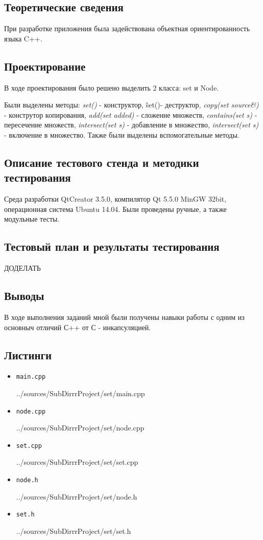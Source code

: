 \documentclass[12pt,a4paper]{report}
\begin{document}
\subsection{Теоретические сведения}
\hspace{\parindent}
При разработке приложения была задействована объектная ориентированность языка C++. 

\subsection{Проектирование}
\hspace{\parindent}
В ходе проектирования было решено выделить 2 класса: set и Node.

\hspace{\parindent}
Были выделены методы: \textit{set()} - конструктор, \~set()- деструктор, \textit{copy(set source\&)} - конструтор копирования, \textit{add(set added)} - сложение множеств, \textit{contains(set s)} - пересечение множеств, \textit{intersect(set s)} - добавление в множество, \textit{intersect(set s)} - включение в множество.
Также были выделены вспомогательные методы.


\subsection{Описание тестового стенда и методики тестирования}
Среда разработки QtCreator 3.5.0, компилятор Qt 5.5.0 MinGW 32bit, операционная система Ubuntu 14.04. Были проведены ручные, а также модульные тесты.

\subsection{Тестовый план и результаты тестирования}
ДОДЕЛАТЬ
\subsection{Выводы}
\hspace{\parindent}
В ходе выполнения заданий мной были получены навыки работы с одним из основныч отличий С++ от С - инкапсуляцией.
\subsection*{Листинги}
\begin{itemize}
\item[] \verb-main.cpp-

{../sources/SubDirrrProject/set/main.cpp}
\item[] \verb-node.cpp-

{../sources/SubDirrrProject/set/node.cpp}
\item[] \verb-set.cpp-

{../sources/SubDirrrProject/set/set.cpp}
\item[] \verb-node.h-

{../sources/SubDirrrProject/set/node.h}
\item[] \verb-set.h-

{../sources/SubDirrrProject/set/set.h}
\end{itemize}
\end{document}
